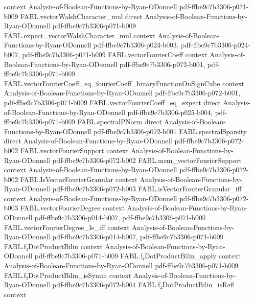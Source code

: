 \begin{theorem}
  {context}
  {Analysis-of-Boolean-Functions-by-Ryan-ODonnell}
  {pdf-ffbe9c7b3306-p071-b009}
\proofstep
  {FABL.vectorWalshCharacter_mul}
  {direct}
  {Analysis-of-Boolean-Functions-by-Ryan-ODonnell}
  {pdf-ffbe9c7b3306-p071-b009}
\proofstep
  {FABL.expect_vectorWalshCharacter_mul}
  {context}
  {Analysis-of-Boolean-Functions-by-Ryan-ODonnell}
  {pdf-ffbe9c7b3306-p024-b003,
    pdf-ffbe9c7b3306-p024-b007,
    pdf-ffbe9c7b3306-p071-b009}
\proofstep
  {FABL.vectorFourierCoeff}
  {context}
  {Analysis-of-Boolean-Functions-by-Ryan-ODonnell}
  {pdf-ffbe9c7b3306-p072-b001,
    pdf-ffbe9c7b3306-p071-b009}
\proofstep
  {FABL.vectorFourierCoeff_eq_fourierCoeff_binaryFunctionOnSignCube}
  {context}
  {Analysis-of-Boolean-Functions-by-Ryan-ODonnell}
  {pdf-ffbe9c7b3306-p072-b001,
    pdf-ffbe9c7b3306-p071-b009}
\proofstep
  {FABL.vectorFourierCoeff_eq_expect}
  {direct}
  {Analysis-of-Boolean-Functions-by-Ryan-ODonnell}
  {pdf-ffbe9c7b3306-p025-b004,
    pdf-ffbe9c7b3306-p071-b009}
\proofstep
  {FABL.spectralPNorm}
  {direct}
  {Analysis-of-Boolean-Functions-by-Ryan-ODonnell}
  {pdf-ffbe9c7b3306-p072-b001}
\proofstep
  {FABL.spectralSparsity}
  {direct}
  {Analysis-of-Boolean-Functions-by-Ryan-ODonnell}
  {pdf-ffbe9c7b3306-p072-b002}
\proofstep
  {FABL.vectorFourierSupport}
  {context}
  {Analysis-of-Boolean-Functions-by-Ryan-ODonnell}
  {pdf-ffbe9c7b3306-p072-b002}
\proofstep
  {FABL.mem_vectorFourierSupport}
  {context}
  {Analysis-of-Boolean-Functions-by-Ryan-ODonnell}
  {pdf-ffbe9c7b3306-p072-b002}
\proofstep
  {FABL.IsVectorFourierGranular}
  {context}
  {Analysis-of-Boolean-Functions-by-Ryan-ODonnell}
  {pdf-ffbe9c7b3306-p072-b003}
\proofstep
  {FABL.isVectorFourierGranular_iff}
  {context}
  {Analysis-of-Boolean-Functions-by-Ryan-ODonnell}
  {pdf-ffbe9c7b3306-p072-b003}
\proofstep
  {FABL.vectorFourierDegree}
  {context}
  {Analysis-of-Boolean-Functions-by-Ryan-ODonnell}
  {pdf-ffbe9c7b3306-p014-b007,
    pdf-ffbe9c7b3306-p071-b009}
\proofstep
  {FABL.vectorFourierDegree_le_iff}
  {context}
  {Analysis-of-Boolean-Functions-by-Ryan-ODonnell}
  {pdf-ffbe9c7b3306-p014-b007,
    pdf-ffbe9c7b3306-p071-b009}
\proofstep
  {FABL.f₂DotProductBilin}
  {context}
  {Analysis-of-Boolean-Functions-by-Ryan-ODonnell}
  {pdf-ffbe9c7b3306-p071-b009}
\proofstep
  {FABL.f₂DotProductBilin_apply}
  {context}
  {Analysis-of-Boolean-Functions-by-Ryan-ODonnell}
  {pdf-ffbe9c7b3306-p071-b009}
\proofstep
  {FABL.f₂DotProductBilin_isSymm}
  {context}
  {Analysis-of-Boolean-Functions-by-Ryan-ODonnell}
  {pdf-ffbe9c7b3306-p072-b004}
\proofstep
  {FABL.f₂DotProductBilin_isRefl}
  {context}

\end{theorem}
